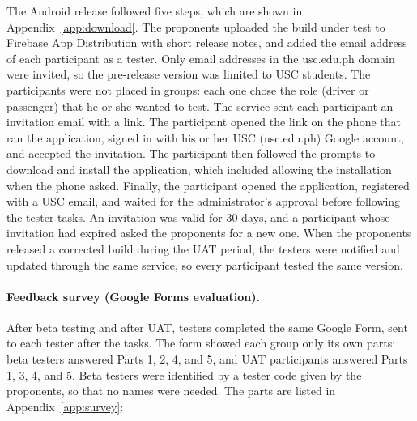 The Android release followed five steps, which are shown in Appendix~\ref{app:download}. The proponents uploaded the build under test to Firebase App Distribution with short release notes, and added the email address of each participant as a tester. Only email addresses in the usc.edu.ph domain were invited, so the pre-release version was limited to USC students. The participants were not placed in groups: each one chose the role (driver or passenger) that he or she wanted to test. The service sent each participant an invitation email with a link. The participant opened the link on the phone that ran the application, signed in with his or her USC (usc.edu.ph) Google account, and accepted the invitation. The participant then followed the prompts to download and install the application, which included allowing the installation when the phone asked. Finally, the participant opened the application, registered with a USC email, and waited for the administrator's approval before following the tester tasks. An invitation was valid for 30 days, and a participant whose invitation had expired asked the proponents for a new one. When the proponents released a corrected build during the UAT period, the testers were notified and updated through the same service, so every participant tested the same version.

\paragraph{Feedback survey (Google Forms evaluation).}\label{sec:survey}
\indent After beta testing and after UAT, testers completed the same Google Form, sent to each tester after the tasks. The form showed each group only its own parts: beta testers answered Parts 1, 2, 4, and 5, and UAT participants answered Parts 1, 3, 4, and 5. Beta testers were identified by a tester code given by the proponents, so that no names were needed. The parts are listed in Appendix~\ref{app:survey}:

